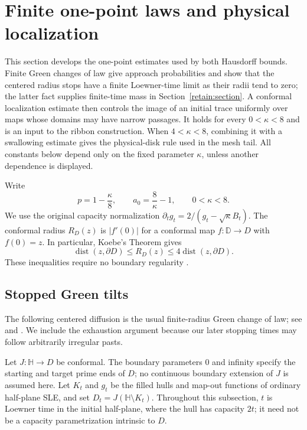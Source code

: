 \documentclass[11pt]{article}
\theoremstyle{definition}
\theoremstyle{remark}
\numberwithin{equation}{section}
\begin{document}
\section{Finite one-point laws and physical localization}
\label{ll:section}

This section develops the one-point estimates used by both Hausdorff
bounds.  Finite Green changes of law give approach probabilities and
show that the centered radius stops have a finite Loewner-time limit as
their radii tend to zero; the latter fact supplies finite-time mass in
Section~\ref{retain:section}.  A conformal localization estimate then
controls the image of an initial trace uniformly over maps whose domains
may have narrow passages.  It holds for every $0<\kappa<8$ and is an
input to the ribbon construction.  When $4<\kappa<8$, combining it with
a swallowing estimate gives the physical-disk rule used in the mesh tail.
All constants below depend only on the fixed parameter $\kappa$, unless
another dependence is displayed.

Write
\[
 p=1-\frac\kappa8,\qquad a_0=\frac8\kappa-1,
 \qquad 0<\kappa<8.
\]
We use the original capacity normalization
$\partial_tg_t=2/(g_t-\sqrt\kappa B_t)$.
The conformal radius $R_D(z)$ is $|f'(0)|$ for a conformal map
$f:\mathbb D\to D$ with $f(0)=z$.
In particular, Koebe's Theorem gives
\begin{equation}
 \operatorname{dist}(z,\partial D)\le R_D(z)
 \le4\operatorname{dist}(z,\partial D).
 \label{ll:koebe}
\end{equation}
These inequalities require no boundary regularity
\cite[Section~3.2]{beliaev2015}.

\subsection{Stopped Green tilts}

The following centered diffusion is the usual finite-radius Green
change of law; see \cite[Section~2]{lawlerzhou2013} and
\cite[Sections~2.3--2.4]{lawlerwerness2013}.
We include the exhaustion argument because our later stopping times
may follow arbitrarily irregular pasts.

Let $J:\mathbb H\to D$ be conformal.  The boundary parameters $0$ and
infinity specify the starting and target prime ends of $D$; no continuous
boundary extension of $J$ is assumed here.  Let $K_t$ and $g_t$ be the
filled hulls and map-out functions of ordinary half-plane SLE, and set
$D_t=J(\mathbb H\setminus K_t)$.  Throughout this subsection, $t$ is
Loewner time in the initial half-plane, where the hull has capacity $2t$;
it need not be a capacity parametrization intrinsic to $D$.
\end{document}
